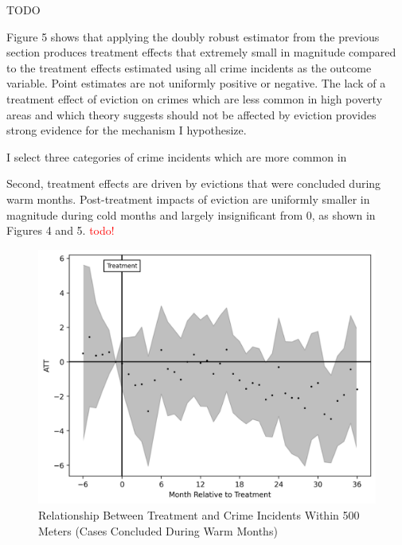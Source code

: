 \documentclass[12pt]{article}
\begin{document}
    \begin{table}[H]
        \centering
        
        \caption{TODO}
        \label{tab:my_label}
    \end{table}

    Figure 5 shows that applying the doubly robust estimator from the previous section produces treatment effects that extremely small in magnitude compared to the treatment effects estimated using all crime incidents as the outcome variable. Point estimates are not uniformly positive or negative. The lack of a treatment effect of eviction on crimes which are less common in high poverty areas and which theory suggests should not be affected by eviction provides strong evidence for the mechanism I hypothesize. 
    
    
    I select three categories of crime incidents which are more common in 



    Second, treatment effects are driven by evictions that were concluded during warm months. Post-treatment impacts of eviction are uniformly smaller in magnitude during cold months and largely insignificant from 0, as shown in Figures 4 and 5. \textcolor{red}{todo!}

    \begin{figure}[H]
        \centering
        \includegraphics{output/group_0_crimes_warm_500m/figures/att_gt_dr_event_study_long_horizon.png}
        \caption{Relationship Between Treatment and Crime Incidents Within 500 Meters (Cases Concluded During Warm Months)}
        \label{fig:my_label}
    \end{figure}
\end{document}
